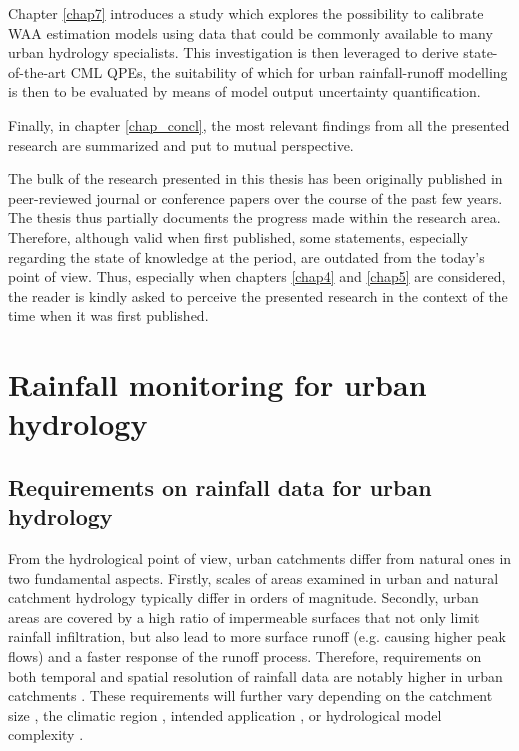 \documentclass{ctuthesis}\usepackage[]{graphicx}\usepackage[]{color}
\begin{document}
Chapter \ref{chap7} introduces a study which explores the possibility to calibrate WAA estimation models using data that could be commonly available to many urban hydrology specialists. This investigation is then leveraged to derive state-of-the-art CML QPEs, the suitability of which for urban rainfall-runoff modelling is then to be evaluated by means of model output uncertainty quantification.

Finally, in chapter \ref{chap_concl}, the most relevant findings from all the presented research are summarized and put to mutual perspective.

The bulk of the research presented in this thesis has been originally published in peer-reviewed journal or conference papers over the course of the past few years. The thesis thus partially documents the progress made within the research area. Therefore, although valid when first published, some statements, especially regarding the state of knowledge at the period, are outdated from the today's point of view. Thus, especially when chapters \ref{chap4} and \ref{chap5} are considered, the reader is kindly asked to perceive the presented research in the context of the time when it was first published.



        


\chapter{Rainfall monitoring for urban hydrology} \label{chap2}


\section{Requirements on rainfall data for urban hydrology}

From the hydrological point of view, urban catchments differ from natural ones in two fundamental aspects. Firstly, scales of areas examined in urban and natural catchment hydrology typically differ in orders of magnitude. Secondly, urban areas are covered by a high ratio of impermeable surfaces that not only limit rainfall infiltration, but also lead to more surface runoff (e.g. causing higher peak flows) and a faster response of the runoff process. Therefore, requirements on both temporal and spatial resolution of rainfall data are notably higher in urban catchments \citep[e.g.][]{schilling1991rainfall, berneTemporalSpatialResolution2004}. These requirements will further vary depending on the catchment size \citep{ochoa-rodriguezImpactSpatialTemporal2015}, the climatic region \citep{berneTemporalSpatialResolution2004}, intended application \citep[e.g. long-term analysis vs. online nowcasting][]{einfaltRoadmapUseRadar2004}, or hydrological model complexity \citep[semi- vs. fully-distributed][]{giresImpactsSmallScale2015}. 
\end{document}
